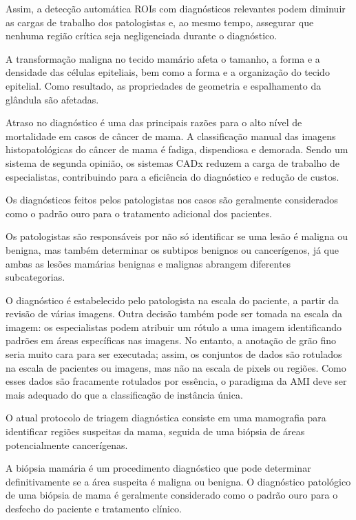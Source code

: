 \documentclass[preprint,12pt,authoryear]{elsarticle}
\begin{document}
Assim, a detecção automática ROIs com diagnósticos relevantes podem diminuir as cargas de trabalho dos patologistas e, ao mesmo tempo, assegurar que nenhuma região crítica seja negligenciada durante o diagnóstico.

A transformação maligna no tecido mamário afeta o tamanho, a forma e a densidade das células epiteliais, bem como a forma e a organização do tecido epitelial. Como resultado, as propriedades de geometria e espalhamento da glândula são afetadas.\cite{NGUYEN2018}

Atraso no diagnóstico é uma das principais razões para o alto nível de mortalidade em casos de câncer de mama. A classificação manual das imagens histopatológicas do câncer de mama é fadiga, dispendiosa e demorada. Sendo um sistema de segunda opinião, os sistemas CADx reduzem a carga de trabalho de especialistas, contribuindo para a eficiência do diagnóstico e redução de custos.\cite{GUPTA2018}

Os diagnósticos feitos pelos patologistas nos casos são geralmente considerados como o padrão ouro para o tratamento adicional dos pacientes.\cite{GANDOMKAR2018a}

Os patologistas são responsáveis ​​por não só identificar se uma lesão é maligna ou benigna, mas também determinar os subtipos benignos ou cancerígenos, já que ambas as lesões mamárias benignas e malignas abrangem diferentes subcategorias. \cite{GANDOMKAR2018a}

O diagnóstico é estabelecido pelo patologista na escala do paciente, a partir da revisão de várias imagens. Outra decisão também pode ser tomada na escala da imagem: os especialistas podem atribuir um rótulo a uma imagem identificando padrões em áreas específicas nas imagens. No entanto, a anotação de grão fino seria muito cara para ser executada; assim, os conjuntos de dados são rotulados na escala de pacientes ou imagens, mas não na escala de pixels ou regiões. Como esses dados são fracamente rotulados por essência, o paradigma da AMI deve ser mais adequado do que a classificação de instância única. \cite{OLIVEIRA2018}

 O atual protocolo de triagem diagnóstica consiste em uma mamografia para identificar regiões suspeitas da mama, seguida de uma biópsia de áreas potencialmente cancerígenas. 
 
 A biópsia mamária é um procedimento diagnóstico que pode determinar definitivamente se a área suspeita é maligna ou benigna. O diagnóstico patológico de uma biópsia de mama é geralmente considerado como o padrão ouro para o desfecho do paciente e tratamento clínico. \cite{WAN2017b} 
 
\end{document}
